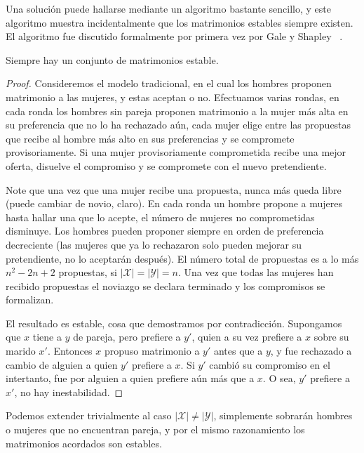   Una solución puede hallarse mediante un algoritmo bastante sencillo,
  y este algoritmo muestra incidentalmente
  que los matrimonios estables siempre existen.
  El algoritmo fue
  discutido formalmente por primera vez por Gale y Shapley~%
    \cite{gale62:_stable_marriage}.
  \begin{theorem}
    \label{theo:stable-marriage-exists}
    Siempre hay un conjunto de matrimonios estable.
  \end{theorem}
  \begin{proof}
    Consideremos el modelo tradicional,
    en el cual los hombres proponen matrimonio a las mujeres,
    y estas aceptan o no.
    Efectuamos varias rondas,
    en cada ronda los hombres sin pareja proponen matrimonio
    a la mujer más alta en su preferencia que no lo ha rechazado aún,
    cada mujer elige entre las propuestas que recibe
    al hombre más alto en sus preferencias
    y se compromete provisoriamente.
    Si una mujer provisoriamente comprometida recibe una mejor oferta,
    disuelve el compromiso
    y se compromete con el nuevo pretendiente.

    Note que una vez que una mujer recibe una propuesta,
    nunca más queda libre
    (puede cambiar de novio,
     claro).
    En cada ronda un hombre propone a mujeres
    hasta hallar una que lo acepte,
    el número de mujeres no comprometidas disminuye.
    Los hombres pueden proponer siempre en orden de preferencia decreciente
    (las mujeres que ya lo rechazaron solo pueden mejorar su pretendiente,
     no lo aceptarán después).
    El número total de propuestas es a lo más \(n^2 - 2 n + 2\) propuestas,
    si \(\lvert \mathscr{X} \rvert = \lvert \mathscr{Y} \rvert = n\).
    Una vez que todas las mujeres han recibido propuestas
    el noviazgo se declara terminado
    y los compromisos se formalizan.

    El resultado es estable,
    cosa que demostramos por contradicción.
    Supongamos que \(x\) tiene a \(y\) de pareja,
    pero prefiere a \(y'\),
    quien a su vez prefiere a \(x\) sobre su marido \(x'\).
    Entonces \(x\) propuso matrimonio a \(y'\) antes que a \(y\),
    y fue rechazado a cambio de alguien a quien \(y'\) prefiere a \(x\).
    Si \(y'\) cambió su compromiso en el intertanto,
    fue por alguien a quien prefiere aún más que a \(x\).
    O sea,
    \(y'\) prefiere a \(x'\),
    no hay inestabilidad.
  \end{proof}
  Podemos extender trivialmente al caso
  \(\lvert \mathscr{X} \rvert \ne \lvert \mathscr{Y} \rvert\),
  simplemente sobrarán hombres o mujeres que no encuentran pareja,
  y por el mismo razonamiento los matrimonios acordados son estables.

